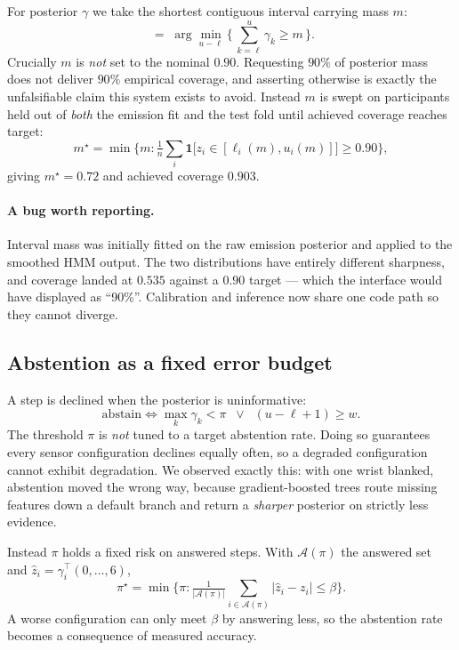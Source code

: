 \documentclass[11pt,a4paper]{article}
\begin{document}
For posterior $\gamma$ we take the shortest contiguous interval carrying mass
$m$:
\begin{equation}
[\,\ell, u\,] \;=\; \arg\min_{u-\ell} \Big\{\, \textstyle\sum_{k=\ell}^{u} \gamma_k \ge m \,\Big\}.
\end{equation}
Crucially $m$ is \emph{not} set to the nominal $0.90$. Requesting $90\%$ of
posterior mass does not deliver $90\%$ empirical coverage, and asserting
otherwise is exactly the unfalsifiable claim this system exists to avoid.
Instead $m$ is swept on participants held out of \emph{both} the emission fit
and the test fold until achieved coverage reaches target:
\begin{equation}
m^{\star} = \min\Big\{ m : \tfrac{1}{n}\textstyle\sum_i \mathbf{1}\big[ z_i \in [\ell_i(m), u_i(m)] \big] \ge 0.90 \Big\},
\end{equation}
giving $m^{\star}=0.72$ and achieved coverage $0.903$.

\paragraph{A bug worth reporting.} Interval mass was initially fitted on the raw
emission posterior and applied to the smoothed HMM output. The two
distributions have entirely different sharpness, and coverage landed at $0.535$
against a $0.90$ target --- which the interface would have displayed as
``90\%''. Calibration and inference now share one code path so they cannot
diverge.

\subsection{Abstention as a fixed error budget}

A step is declined when the posterior is uninformative:
\begin{equation}
\text{abstain} \iff \max_k \gamma_k < \pi \;\;\lor\;\; (u - \ell + 1) \ge w .
\end{equation}
The threshold $\pi$ is \emph{not} tuned to a target abstention rate. Doing so
guarantees every sensor configuration declines equally often, so a degraded
configuration cannot exhibit degradation. We observed exactly this: with one
wrist blanked, abstention moved the wrong way, because gradient-boosted trees
route missing features down a default branch and return a \emph{sharper}
posterior on strictly less evidence.

Instead $\pi$ holds a fixed risk on answered steps. With $\mathcal{A}(\pi)$ the
answered set and $\hat z_i = \gamma_i^\top(0,\dots,6)$,
\begin{equation}
\pi^{\star} = \min\Big\{ \pi : \tfrac{1}{|\mathcal{A}(\pi)|}\textstyle\sum_{i \in \mathcal{A}(\pi)} |\hat z_i - z_i| \le \beta \Big\}.
\end{equation}
A worse configuration can only meet $\beta$ by answering less, so the
abstention rate becomes a consequence of measured accuracy.
\end{document}
